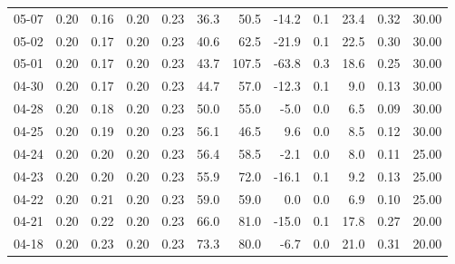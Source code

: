 \begin{threeparttable}
{\begin{tabular}{lrrrrrrrrrrr}
  05-07 &          0.20 &          0.16 &          0.20 &        0.23 &                36.3 &                50.5 &      -14.2 &                 0.1 &             23.4 &            0.32 &                  30.00 \\
  05-02 &          0.20 &          0.17 &          0.20 &        0.23 &                40.6 &                62.5 &      -21.9 &                 0.1 &             22.5 &            0.30 &                  30.00 \\
  05-01 &          0.20 &          0.17 &          0.20 &        0.23 &                43.7 &               107.5 &      -63.8 &                 0.3 &             18.6 &            0.25 &                  30.00 \\
  04-30 &          0.20 &          0.17 &          0.20 &        0.23 &                44.7 &                57.0 &      -12.3 &                 0.1 &              9.0 &            0.13 &                  30.00 \\
  04-28 &          0.20 &          0.18 &          0.20 &        0.23 &                50.0 &                55.0 &       -5.0 &                 0.0 &              6.5 &            0.09 &                  30.00 \\
  04-25 &          0.20 &          0.19 &          0.20 &        0.23 &                56.1 &                46.5 &        9.6 &                 0.0 &              8.5 &            0.12 &                  30.00 \\
  04-24 &          0.20 &          0.20 &          0.20 &        0.23 &                56.4 &                58.5 &       -2.1 &                 0.0 &              8.0 &            0.11 &                  25.00 \\
  04-23 &          0.20 &          0.20 &          0.20 &        0.23 &                55.9 &                72.0 &      -16.1 &                 0.1 &              9.2 &            0.13 &                  25.00 \\
  04-22 &          0.20 &          0.21 &          0.20 &        0.23 &                59.0 &                59.0 &        0.0 &                 0.0 &              6.9 &            0.10 &                  25.00 \\
  04-21 &          0.20 &          0.22 &          0.20 &        0.23 &                66.0 &                81.0 &      -15.0 &                 0.1 &             17.8 &            0.27 &                  20.00 \\
  04-18 &          0.20 &          0.23 &          0.20 &        0.23 &                73.3 &                80.0 &       -6.7 &                 0.0 &             21.0 &            0.31 &                  20.00 \\

\end{tabular}}
\end{threeparttable}
